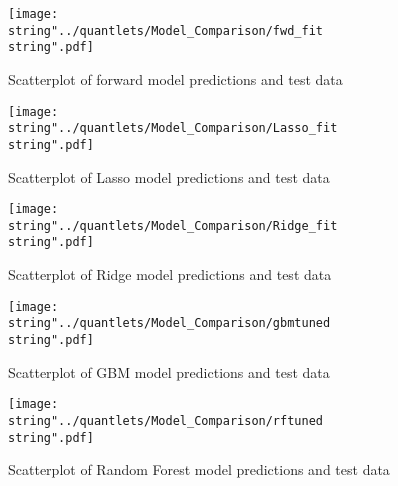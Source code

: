 \begin{figure}[H]
\centering
	\texttt{[image: \\string"../quantlets/Model\_Comparison/fwd\_fit\\string".pdf]}
  	\caption{Scatterplot of forward model predictions and test data}
  	\label{fig:fwd}
\end{figure}

\begin{figure}[H]
\centering
	\texttt{[image: \\string"../quantlets/Model\_Comparison/Lasso\_fit\\string".pdf]}
  	\caption{Scatterplot of Lasso model predictions and test data}
  	\label{fig:Lasso}
\end{figure}

\begin{figure}[H]
\centering
	\texttt{[image: \\string"../quantlets/Model\_Comparison/Ridge\_fit\\string".pdf]}
  	\caption{Scatterplot of Ridge model predictions and test data}
  	\label{fig:Ridge}
\end{figure}

\begin{figure}[H]
\centering
	\texttt{[image: \\string"../quantlets/Model\_Comparison/gbmtuned\\string".pdf]}
  	\caption{Scatterplot of GBM model predictions and test data}
  	\label{fig:gbm}
\end{figure}

\begin{figure}[H]
\centering
	\texttt{[image: \\string"../quantlets/Model\_Comparison/rftuned\\string".pdf]}
  	\caption{Scatterplot of Random Forest model predictions and test data}
  	\label{fig:rf}
\end{figure}



